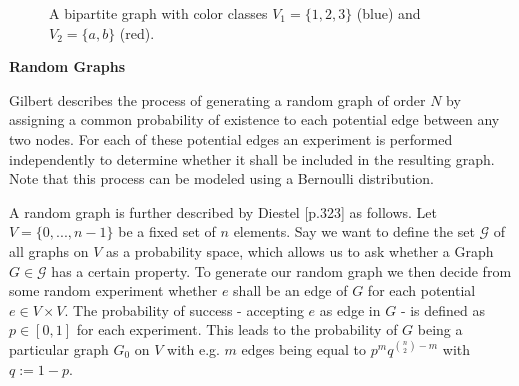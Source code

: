 \begin{figure}[h]
    \centering
    \caption{A bipartite graph with color classes $V_1 = \{1,2,3\}$ (blue) and $V_2=\{a,b\}$ (red).}
    \label{fig:bipartite-colored}
\end{figure}

\textbf{Random Graphs}
\label{sec:random-graphs}

Gilbert \cite{gilbert1959random} describes the process of generating a random graph of order $N$ by assigning a common probability of existence to each potential edge between any two nodes. For each of these potential edges an experiment is performed independently to determine whether it shall be included in the resulting graph. Note that this process can be modeled using a Bernoulli distribution.

A random graph is further described by Diestel \cite{Diestel2017}[p.323] as follows. Let $V = \{0,...,n-1\}$ be a fixed set of $n$ elements. Say we want to define the set $\mathcal{G}$ of all graphs on $V$ as a probability space, which allows us to ask whether a Graph $G \in \mathcal{G}$ has a certain property. To generate our random graph we then decide from some random experiment whether $e$ shall be an edge of $G$ for each potential $e \in V \times V$. The probability of success - accepting $e$ as edge in $G$ - is defined as $p \in [0,1]$ for each experiment. This leads to the probability of $G$ being a particular graph $G_0$ on $V$ with e.g. $m$ edges being equal to $p^m q^{\binom{n}{2}-m}$ with $q:=1-p$.
\bigskip

